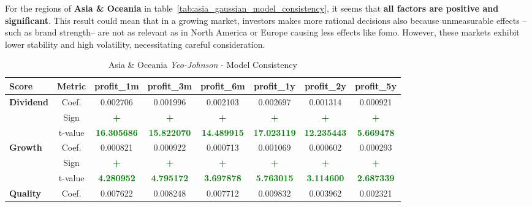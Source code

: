 \documentclass[11pt,english,a4paper,hidelinks]{book}
\begin{document}
\noindent For the regions of \textbf{Asia \& Oceania} in table~\ref{tab:asia_gaussian_model_consistency}, it seems that \textbf{all factors are positive and significant}. This result could mean that in a growing market, investors makes more rational decisions also because unmeasurable effects --such as brand strength-- are not as relevant as in North America or Europe causing less effects like \acrshort{fomo}. However, these markets exhibit lower stability and high volatility, necessitating careful consideration.
\begin{table}[H]
    \centering
    \caption{Asia \& Oceania \textit{Yeo-Johnson} - Model Consistency}
    \begin{tabular}{lccccccc}
        \toprule
        \textbf{Score} & \textbf{Metric} & \textbf{profit\_1m} & \textbf{profit\_3m} & \textbf{profit\_6m} & \textbf{profit\_1y} & \textbf{profit\_2y} & \textbf{profit\_5y} \\
        \midrule
        \multirow{3}{*}{\textbf{Dividend}} 
            & Coef. & 0.002706 & 0.001996 & 0.002103 & 0.002697 & 0.001314 & 0.000921 \\
            & Sign & \textbf{\textcolor{green}{+}} & \textbf{\textcolor{green}{+}} & \textbf{\textcolor{green}{+}} & \textbf{\textcolor{green}{+}} & \textbf{\textcolor{green}{+}} & \textbf{\textcolor{green}{+}} \\
            & t-value & \textbf{\textcolor{green}{16.305686}} & \textbf{\textcolor{green}{15.822070}} & \textbf{\textcolor{green}{14.489915}} & \textbf{\textcolor{green}{17.023119}} & \textbf{\textcolor{green}{12.235443}} & \textbf{\textcolor{green}{5.669478}} \\
        \midrule
        \multirow{3}{*}{\textbf{Growth}} 
            & Coef. & 0.000821 & 0.000922 & 0.000713 & 0.001069 & 0.000602 & 0.000293 \\
            & Sign & \textbf{\textcolor{green}{+}} & \textbf{\textcolor{green}{+}} & \textbf{\textcolor{green}{+}} & \textbf{\textcolor{green}{+}} & \textbf{\textcolor{green}{+}} & \textbf{\textcolor{green}{+}} \\
            & t-value & \textbf{\textcolor{green}{4.280952}} & \textbf{\textcolor{green}{4.795172}} & \textbf{\textcolor{green}{3.697878}} & \textbf{\textcolor{green}{5.763015}} & \textbf{\textcolor{green}{3.114600}} & \textbf{\textcolor{green}{2.687339}} \\
        \midrule
        \multirow{3}{*}{\textbf{Quality}} 
            & Coef. & 0.007622 & 0.008248 & 0.007712 & 0.009832 & 0.003962 & 0.002321 \\

\end{tabular}
\end{table}
\end{document}
